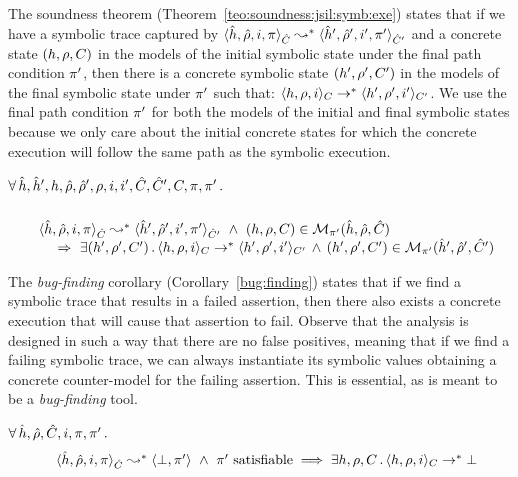 The soundness theorem (Theorem~\ref{teo:soundness:jsil:symb:exe}) states that if we have a symbolic trace captured by 
$\symbtranstrans{\sheap, \sstore, i, \pc}{\sheap', \sstore', i', \pc'}[\sctx][\sctx']$ 
and a concrete state $(h, \rho, C)$ in the models of the initial symbolic state under 
the final path condition $\pi'$, then there is a concrete symbolic state $(h', \rho', C')$ 
in the models of the final symbolic state under $\pi'$ such that: 
$\semtranstrans{\heap, \store, i}{\heap', \store', i'}[\ctx][\ctx']$. 
 We use the final path condition $\pi'$ for both the models of the initial and final 
symbolic states because we only care about the initial concrete states for which 
the concrete execution will follow the same path as the symbolic execution. 
%
\begin{theorem}[Soundness]\label{teo:soundness:jsil:symb:exe}
$\forall \, \hat{h}, \hat{h}', h, \hat\rho, \hat\rho', \rho, i, i', \hat{C}, \hat{C}', C, \pi, \pi' \, . \,$
\vspace*{-0.65cm}
$$
\begin{array}{l}
  \\  
\quad \symbtranstrans{\sheap, \sstore, i, \pc}{\sheap', \sstore', i', \pc'}[\sctx][\sctx'] 
   \ \wedge \ 
      (\heap, \store, \ctx) \in \smodels{\sheap, \sstore, \sctx}{\pc'} \\ \quad \quad
      	 \ \Rightarrow \ \exists (\heap', \store', \ctx') \, . \, 
	 	 \semtranstrans{\heap, \store, i}{\heap', \store', i'}[\ctx][\ctx']
		\, \wedge \, 
		(\heap', \store', \ctx') \in \smodels{\sheap', \sstore', \sctx'}{\pc'}  
\end{array}
$$
\end{theorem}
%
The \emph{bug-finding} corollary (Corollary~\ref{bug:finding}) states that if 
we find a symbolic trace that results in a failed assertion, 
then there also exists a concrete execution that will cause that assertion to fail.
Observe that the analysis is designed in such a way that there are no false positives, 
meaning that if we find a failing symbolic trace,
we can always instantiate its symbolic values obtaining a concrete counter-model for the 
failing assertion. This is essential, as \jilette is meant to be a \emph{bug-finding} tool.
%
\begin{corollary}[Bug-finding]\label{bug:finding}
$\forall \, \hat{h}, \hat\rho, \hat{C}, i, \pi, \pi' \, . \,$
\vspace*{-0.2cm}
$$
\begin{array}{l}
 \quad \symbtranstranserr{\sheap, \sstore, i, \pc}{\sctx}{\pc'}  \ \wedge \ \pc' \ \text{satisfiable} \implies 
     \exists \heap, \store, \ctx \, . \, \semtranstranserr{\heap, \store, i}[\ctx]
\end{array}
$$
\end{corollary}
